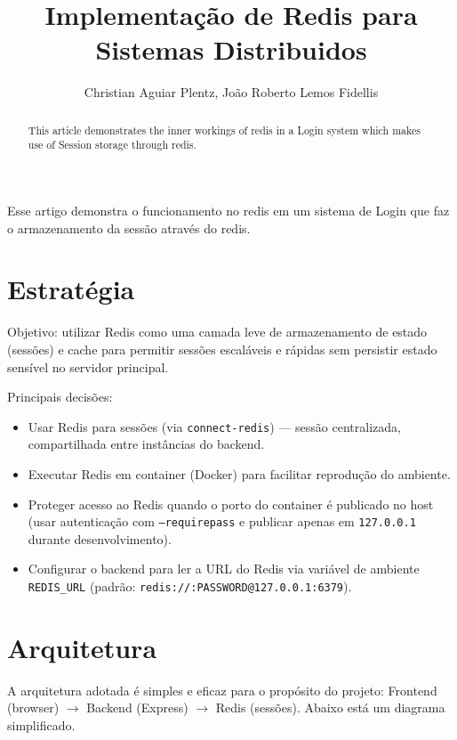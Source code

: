 \documentclass[12pt]{article}
\title{Implementação de Redis para Sistemas Distribuidos}
\author{Christian Aguiar Plentz\inst{1}, João Roberto Lemos Fidellis\inst{2} }
\begin{document}
 

\maketitle

\begin{resumo}
    Esse artigo demonstra o funcionamento no redis em um sistema de Login 
    que faz o armazenamento da sessão através do redis.
\end{resumo}

\begin{abstract}
    This article demonstrates the inner workings of redis in a Login system
    which makes use of Session storage through redis.
\end{abstract}

\section{Estratégia}
Objetivo: utilizar Redis como uma camada leve de armazenamento de estado (sessões) e cache para permitir sessões escaláveis e rápidas sem persistir estado sensível no servidor principal.

Principais decisões:
\begin{itemize}
  \item Usar Redis para sessões (via \texttt{connect-redis}) — sessão centralizada, compartilhada entre instâncias do backend.
  \item Executar Redis em container (Docker) para facilitar reprodução do ambiente.
  \item Proteger acesso ao Redis quando o porto do container é publicado no host 
  (usar autenticação com \texttt{--requirepass} e publicar apenas em 
  \texttt{127.0.0.1} durante desenvolvimento).
  
  \item Configurar o backend para ler a URL do Redis via variável de ambiente \\ 
  \texttt{REDIS\_URL} (padrão: \texttt{redis://:PASSWORD@127.0.0.1:6379}).
\end{itemize}

\section{Arquitetura}

A arquitetura adotada é simples e eficaz para o propósito do projeto: Frontend (browser) \(\to\) Backend (Express) \(\to\) Redis (sessões). Abaixo está um diagrama simplificado.
\end{document}
